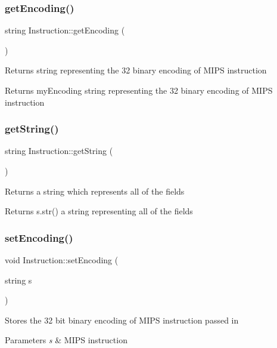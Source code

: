 \subsubsection{\texorpdfstring{get\+Encoding()}{getEncoding()}}
{\footnotesize\ttfamily string Instruction\+::get\+Encoding (\begin{DoxyParamCaption}{ }\end{DoxyParamCaption})\hspace{0.3cm}{\ttfamily [inline]}}

Returns string representing the 32 binary encoding of M\+I\+PS instruction \begin{DoxyReturn}{Returns}
my\+Encoding string representing the 32 binary encoding of M\+I\+PS instruction 
\end{DoxyReturn}
\mbox{\label{class_instruction_a3deaa9fb80e0e3e5fbc6b32efaea2f98}} 
\subsubsection{\texorpdfstring{get\+String()}{getString()}}
{\footnotesize\ttfamily string Instruction\+::get\+String (\begin{DoxyParamCaption}{ }\end{DoxyParamCaption})}

Returns a string which represents all of the fields \begin{DoxyReturn}{Returns}
s.\+str() a string representing all of the fields 
\end{DoxyReturn}
\mbox{\label{class_instruction_ab10e98d595622a19f2ed0c94098692a2}} 
\subsubsection{\texorpdfstring{set\+Encoding()}{setEncoding()}}
{\footnotesize\ttfamily void Instruction\+::set\+Encoding (\begin{DoxyParamCaption}\item[{string}]{s }\end{DoxyParamCaption})\hspace{0.3cm}{\ttfamily [inline]}}

Stores the 32 bit binary encoding of M\+I\+PS instruction passed in 
\begin{DoxyParams}{Parameters}
{\em s} & M\+I\+PS instruction \\
\hline
\end{DoxyParams}
\mbox{\label{class_instruction_ab7bd4ac378e25f67296e30ab421602f8}} 
